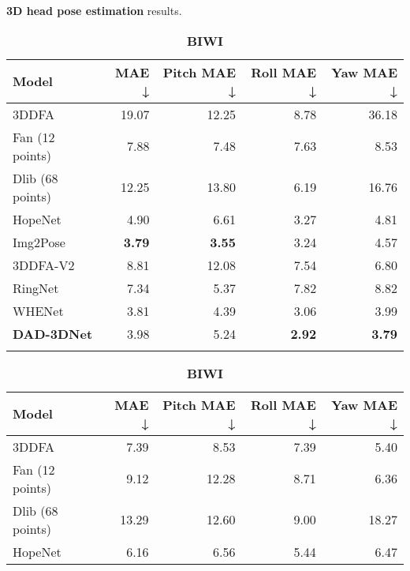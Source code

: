 \documentclass[10pt,twocolumn,letterpaper]{article}
\begin{document}
\begin{table}[t]
\footnotesize
\caption{\textbf{3D head pose estimation} results.}
\setlength{\tabcolsep}{3pt}
	\begin{subtable}[t]{.99\linewidth}\centering
		{\scriptsize
\begin{adjustbox}{width=0.99\textwidth}
\begin{tabular}{@{}lrrrr@{}}
\noalign{\smallskip}
\toprule \textbf{Model} & \textbf{MAE} ↓ & \textbf{Pitch MAE} ↓ & \textbf{Roll MAE} ↓ & \textbf{Yaw MAE} ↓ \\\toprule 3DDFA \cite{3ddfa_cleardusk, zhu2017face} \ & 19.07 & 12.25 & 8.78 & 36.18\\
Fan (12 points)\cite{FacePoseNet} & 7.88 & 7.48 & 7.63 & 8.53\\
Dlib (68 points)\cite{dlib09} & 12.25 & 13.80 & 6.19 & 16.76\\
HopeNet\cite{HOPE-Net} & 4.90 & 6.61 & 3.27 & 4.81\\
Img2Pose\cite{img2pose} & \textbf{3.79} & \textbf{3.55} & 3.24 & 4.57\\
3DDFA-V2\cite{3ddfa_cleardusk, guo2020towards} & 8.81 & 12.08 & 7.54 & 6.80 \\
RingNet\cite{RingNet} & 7.34 & 5.37 & 7.82 & 8.82 \\
WHENet\cite{WHENet} & 3.81 & 4.39 & 3.06 & 3.99 \\
\textbf{DAD-3DNet} & 3.98 & 5.24 & \textbf{2.92} & \textbf{3.79}\\\bottomrule \noalign{\smallskip}
\end{tabular}
\end{adjustbox}
\caption{\textbf{BIWI}\cite{BIWI}}
\label{t:3dpose_biwi} }	
	\end{subtable}
	\hfill
	\begin{subtable}[t]{.99\linewidth}\centering
		{\begin{adjustbox}{width=0.99\textwidth}
\begin{tabular}{@{}lrrrr@{}}
\noalign{\smallskip}
\toprule \textbf{Model} & \textbf{MAE} ↓ & \textbf{Pitch MAE} ↓ & \textbf{Roll MAE} ↓ & \textbf{Yaw MAE} ↓ \\\toprule 3DDFA\cite{3ddfa_cleardusk, zhu2017face} & 7.39 & 8.53 & 7.39 & 5.40\\
Fan (12 points)\cite{FacePoseNet} & 9.12 & 12.28 & 8.71 & 6.36\\
Dlib (68 points)\cite{dlib09} & 13.29 & 12.60 & 9.00 & 18.27\\
HopeNet\cite{HOPE-Net} & 6.16 & 6.56 & 5.44 & 6.47\\

\end{tabular}
\end{adjustbox}}
\end{subtable}
\end{table}
\end{document}
